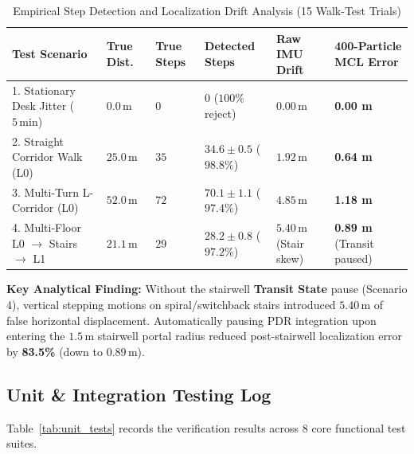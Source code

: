 \documentclass[11pt,a4paper]{article}
\begin{document}
\begin{table}[h!]
\centering
\caption{Empirical Step Detection and Localization Drift Analysis (15 Walk-Test Trials)}
\label{tab:drift_results}
\renewcommand{\arraystretch}{1.25}
\footnotesize
\begin{tabularx}{\textwidth}{Y C{1.5cm} C{1.5cm} C{2.6cm} C{2.2cm} C{2.5cm}}
\toprule
\textbf{Test Scenario} & \textbf{True Dist.} & \textbf{True Steps} & \textbf{Detected Steps} & \textbf{Raw IMU Drift} & \textbf{400-Particle MCL Error} \\
. Stationary Desk Jitter ($5\,\text{min}$) & $0.0\,\text{m}$ & $0$ & $0$ ($100\%$ reject) & $0.00\,\text{m}$ & \textbf{0.00 m} \\
2. Straight Corridor Walk (L0) & $25.0\,\text{m}$ & $35$ & $34.6 \pm 0.5$ ($98.8\%$) & $1.92\,\text{m}$ & \textbf{0.64 m} \\
3. Multi-Turn L-Corridor (L0) & $52.0\,\text{m}$ & $72$ & $70.1 \pm 1.1$ ($97.4\%$) & $4.85\,\text{m}$ & \textbf{1.18 m} \\
4. Multi-Floor L0 $\rightarrow$ Stairs $\rightarrow$ L1 & $21.1\,\text{m}$ & $29$ & $28.2 \pm 0.8$ ($97.2\%$) & $5.40\,\text{m}$ (Stair skew) & \textbf{0.89 m} (Transit paused) \\
\bottomrule
\end{tabularx}
\end{table}

\textbf{Key Analytical Finding:} Without the stairwell \textbf{Transit State} pause (Scenario 4), vertical stepping motions on spiral/switchback stairs introduced $5.40\,\text{m}$ of false horizontal displacement. Automatically pausing PDR integration upon entering the $1.5\,\text{m}$ stairwell portal radius reduced post-stairwell localization error by \textbf{83.5\%} (down to $0.89\,\text{m}$).

\subsection{Unit \& Integration Testing Log}
Table~\ref{tab:unit_tests} records the verification results across 8 core functional test suites.
\end{document}
